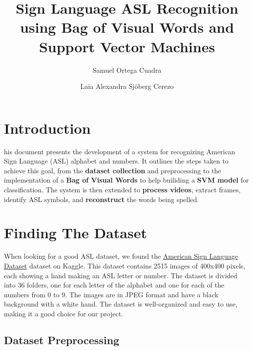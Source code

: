 \documentclass[9pt,a4paper,twoside]{tau-class/tau}
\title{Sign Language ASL Recognition using Bag of Visual Words and Support Vector Machines}
\author[a]{Samuel Ortega Cuadra}
\author[b]{Laia Alexandra Sjöberg Cerezo}
\affil[a]{1669776}
\affil[b]{1667894}
\begin{document}
    \maketitle 
    \thispagestyle{firststyle} \tauabstract 
    \tableofcontents
    \linenumbers 
    

\section{Introduction}

    his document presents the development of a system for recognizing American Sign Language (ASL) alphabet and numbers. It outlines the steps taken to achieve this goal, from the \textbf{dataset collection} and preprocessing to the implementation of a \textbf{Bag of Visual Words} to help builiding a \textbf{SVM model} for classification. The system is then extended to \textbf{process videos}, extract frames, identify ASL symbols, and \textbf{reconstruct} the words being spelled.
\section{Finding The Dataset}

	When looking for a good ASL dataset, we found the \href{https://www.kaggle.com/datasets/ayuraj/asl-dataset}{American Sign Language Dataset} dataset on Kaggle. This dataset contains 2515 images of 400x400 pixels, each showing a hand making an ASL letter or number. The dataset is divided into 36 folders, one for each letter of the alphabet and one for each of the numbers from 0 to 9. The images are in JPEG format and have a black background with a white hand. The dataset is well-organized and easy to use, making it a good choice for our project.

    \subsection{Dataset Preprocessing}
\end{document}
